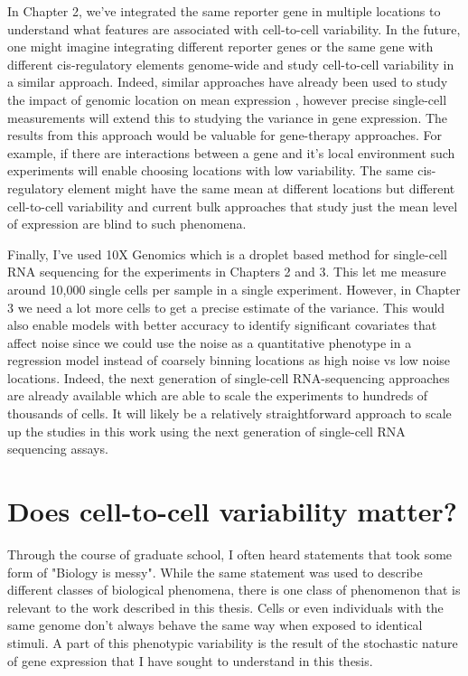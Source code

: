 In Chapter 2, we've integrated the same reporter gene in multiple locations to understand what features are associated with cell-to-cell variability. In the future, one might imagine integrating different reporter genes or the same gene with different cis-regulatory elements genome-wide and study cell-to-cell variability in a similar approach. Indeed, similar approaches have already been used to study the impact of genomic location on mean expression \cite{hong2022gr}, however precise single-cell measurements will extend this to studying the variance in gene expression. The results from this approach would be valuable for gene-therapy approaches. For example, if there are interactions between a gene and it's local environment such experiments will enable choosing locations with low variability. The same cis-regulatory element might have the same mean at different locations but different cell-to-cell variability and current bulk approaches that study just the mean level of expression are blind to such phenomena.

Finally, I've used 10X Genomics which is a droplet based method for single-cell RNA sequencing for the experiments in Chapters 2 and 3. This let me measure around 10,000 single cells per sample in a single experiment. However, in Chapter 3 we need a lot more cells to get a precise estimate of the variance. This would also enable models with better accuracy to identify significant covariates that affect noise since we could use the noise as a quantitative phenotype in a regression model instead of coarsely binning locations as high noise vs low noise locations. Indeed, the next generation of single-cell RNA-sequencing approaches are already available \cite{caoj_shendurej:ComprehensiveSinglecell2017} which are able to scale the experiments to hundreds of thousands of cells. It will likely be a relatively straightforward approach to scale up the studies in this work using the next generation of single-cell RNA sequencing assays. 

\section{Does cell-to-cell variability matter?}

Through the course of graduate school, I often heard statements that took some form of "Biology is messy". While the same statement was used to describe different classes of biological phenomena, there is one class of phenomenon that is relevant to the work described in this thesis. Cells or even individuals with the same genome don't always behave the same way when exposed to identical stimuli. A part of this phenotypic variability is the result of the stochastic nature of gene expression that I have sought to understand in this thesis.

